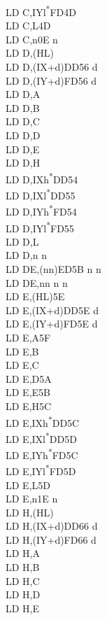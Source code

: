 \documentclass[twoside,openright,a4paper]{book}
\begin{document}
\begin{multicols}{3}
{\begin{tabbing}
	LD C,IYl\textsuperscript{*}\>FD4D\\
	LD C,L\>4D\\
	LD C,n\>0E n\\
	LD D,(HL)\\
	LD D,(IX+d)\>DD56 d\\
	LD D,(IY+d)\>FD56 d\\
	LD D,A\\
	LD D,B\\
	LD D,C\\
	LD D,D\\
	LD D,E\\
	LD D,H\\
	LD D,IXh\textsuperscript{*}\>DD54\\
	LD D,IXl\textsuperscript{*}\>DD55\\
	LD D,IYh\textsuperscript{*}\>FD54\\
	LD D,IYl\textsuperscript{*}\>FD55\\
	LD D,L\\
	LD D,n n\\
	LD DE,(nn)\>ED5B n n\\
	LD DE,nn n n\\
	LD E,(HL)\>5E\\
	LD E,(IX+d)\>DD5E d\\
	LD E,(IY+d)\>FD5E d\\
	LD E,A\>5F\\
	LD E,B\\
	LD E,C\\
	LD E,D\>5A\\
	LD E,E\>5B\\
	LD E,H\>5C\\
	LD E,IXh\textsuperscript{*}\>DD5C\\
	LD E,IXl\textsuperscript{*}\>DD5D\\
	LD E,IYh\textsuperscript{*}\>FD5C\\
	LD E,IYl\textsuperscript{*}\>FD5D\\
	LD E,L\>5D\\
	LD E,n\>1E n\\
	LD H,(HL)\\
	LD H,(IX+d)\>DD66 d\\
	LD H,(IY+d)\>FD66 d\\
	LD H,A\\
	LD H,B\\
	LD H,C\\
	LD H,D\\
	LD H,E\\

\end{tabbing}}
\end{multicols}
\end{document}
